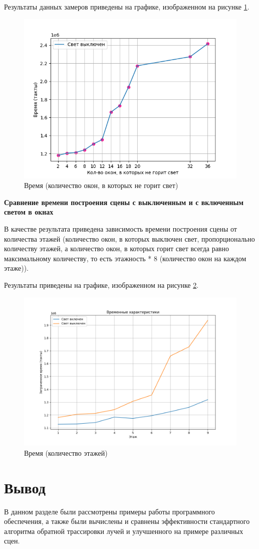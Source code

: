 Результаты данных замеров приведены на графике, изображенном на рисунке \ref{img:e2}.
\begin{figure}[H]
	\begin{center}
		\includegraphics[scale=0.65]{img/res/e2.png}
	\end{center}
	\captionsetup{justification=centering}
	\caption{Время (количество окон, в которых не горит свет)}
	\label{img:e2}
\end{figure} 


\textbf{Сравнение времени построения сцены с выключенным и с включенным светом в окнах}

В качестве результата приведена зависимость времени построения сцены от количества этажей (количество окон, в которых выключен свет, пропорционально количеству этажей, а количество окон, в которых горит свет всегда равно максимальному количеству, то есть этажность * 8 (количество окон на каждом этаже)).

Результаты приведены на графике, изображенном на рисунке \ref{img:e3}.
\begin{figure}[H]
	\begin{center}
		\includegraphics[scale=0.50]{img/res/e3.png}
	\end{center}
	\captionsetup{justification=centering}
	\caption{Время (количество этажей)}
	\label{img:e3}
\end{figure} 


\section{Вывод}
В данном разделе были рассмотрены примеры работы программного обеспечения, а также были вычислены и сравнены эффективности стандартного алгоритма обратной трассировки лучей и улучшенного на примере различных сцен.
 